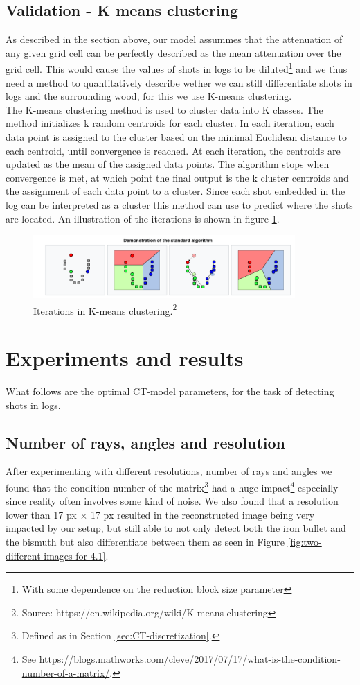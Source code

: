 \documentclass{article}
\begin{document}
\subsection{Validation - K means clustering}
As described in the section above, our model assummes that the attenuation of any given grid cell can be perfectly described as the mean attenuation over the grid cell. This would cause the values of shots in logs to be diluted\footnote{With some dependence on the reduction block size parameter} and we thus need a method to quantitatively describe wether we can still differentiate shots in logs and the surrounding wood, for this we use K-means clustering. \\
The K-means clustering method is used to cluster data into K classes. The method initializes k random centroids for each cluster. In each iteration, each data point is assigned to the cluster based on the minimal Euclidean distance to each centroid, until convergence is reached. At each iteration, the centroids are updated as the mean of the assigned data points. The algorithm stops when convergence is met, at which point the final output is the k cluster centroids and the assignment of each data point to a cluster. Since each shot embedded in the log can be interpreted as a cluster this method can use to predict where the shots are located. An illustration of the iterations is shown in figure \ref{Kmeans}. 
\begin{figure}[H]
    \centering
    \includegraphics[width=10cm]{images/Kmeans.png}
    \caption[Iterations in K-means clustering]{\small Iterations in K-means clustering.\footnote{Source: https://en.wikipedia.org/wiki/K-means-clustering}}
    \label{Kmeans}
\end{figure}


\section{Experiments and results}
What follows are the optimal CT-model parameters, for the task of detecting shots in logs. 

\subsection{Number of rays, angles and resolution}\label{sec:num-rays-angles-resolution} 
After experimenting with different resolutions, number of rays and angles we found that the condition number of the matrix\footnote{Defined as in Section \ref{sec:CT-discretization}.} had a huge impact\footnote{See \url{https://blogs.mathworks.com/cleve/2017/07/17/what-is-the-condition-number-of-a-matrix/}.} especially since reality often involves some kind of noise. 
We also found that a resolution lower than 17 px $\times$ 17 px resulted in the reconstructed image being very impacted by our setup, but still able to not only detect both the iron bullet and the bismuth but also differentiate between them as seen in Figure \ref{fig:two-different-images-for-4.1}. 
\end{document}
